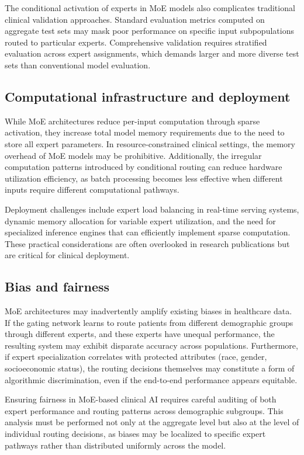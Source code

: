 The conditional activation of experts in MoE models also complicates traditional clinical validation approaches. Standard evaluation metrics computed on aggregate test sets may mask poor performance on specific input subpopulations routed to particular experts. Comprehensive validation requires stratified evaluation across expert assignments, which demands larger and more diverse test sets than conventional model evaluation.

\subsection*{Computational infrastructure and deployment}

While MoE architectures reduce per-input computation through sparse activation, they increase total model memory requirements due to the need to store all expert parameters. In resource-constrained clinical settings, the memory overhead of MoE models may be prohibitive. Additionally, the irregular computation patterns introduced by conditional routing can reduce hardware utilization efficiency, as batch processing becomes less effective when different inputs require different computational pathways.

Deployment challenges include expert load balancing in real-time serving systems, dynamic memory allocation for variable expert utilization, and the need for specialized inference engines that can efficiently implement sparse computation. These practical considerations are often overlooked in research publications but are critical for clinical deployment.

\subsection*{Bias and fairness}

MoE architectures may inadvertently amplify existing biases in healthcare data. If the gating network learns to route patients from different demographic groups through different experts, and these experts have unequal performance, the resulting system may exhibit disparate accuracy across populations. Furthermore, if expert specialization correlates with protected attributes (race, gender, socioeconomic status), the routing decisions themselves may constitute a form of algorithmic discrimination, even if the end-to-end performance appears equitable.

Ensuring fairness in MoE-based clinical AI requires careful auditing of both expert performance and routing patterns across demographic subgroups. This analysis must be performed not only at the aggregate level but also at the level of individual routing decisions, as biases may be localized to specific expert pathways rather than distributed uniformly across the model.

